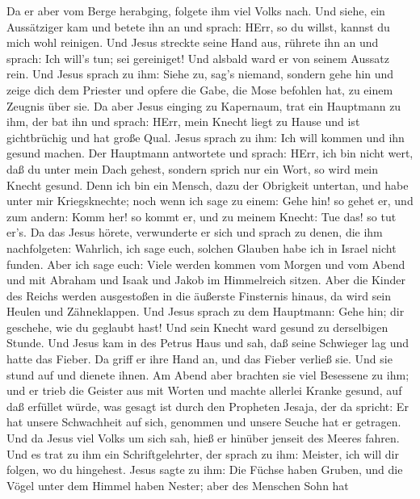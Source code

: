  Da er aber vom Berge herabging, folgete ihm viel Volks
nach.  Und siehe, ein Aussätziger kam und betete ihn an und
sprach: HErr, so du willst, kannst du mich wohl reinigen. 
Und Jesus streckte seine Hand aus, rührete ihn an und sprach: Ich will's
tun; sei gereiniget! Und alsbald ward er von seinem Aussatz rein.
 Und Jesus sprach zu ihm: Siehe zu, sag's niemand, sondern
gehe hin und zeige dich dem Priester und opfere die Gabe, die Mose
befohlen hat, zu einem Zeugnis über sie.  Da aber Jesus
einging zu Kapernaum, trat ein Hauptmann zu ihm, der bat ihn
 und sprach: HErr, mein Knecht liegt zu Hause und ist
gichtbrüchig und hat große Qual.  Jesus sprach zu ihm: Ich
will kommen und ihn gesund machen.  Der Hauptmann antwortete
und sprach: HErr, ich bin nicht wert, daß du unter mein Dach gehest,
sondern sprich nur ein Wort, so wird mein Knecht gesund. 
Denn ich bin ein Mensch, dazu der Obrigkeit untertan, und habe unter mir
Kriegsknechte; noch wenn ich sage zu einem: Gehe hin! so gehet er, und
zum andern: Komm her! so kommt er, und zu meinem Knecht: Tue das! so tut
er's.  Da das Jesus hörete, verwunderte er sich und sprach
zu denen, die ihm nachfolgeten: Wahrlich, ich sage euch, solchen Glauben
habe ich in Israel nicht funden.  Aber ich sage euch: Viele
werden kommen vom Morgen und vom Abend und mit Abraham und Isaak und
Jakob im Himmelreich sitzen.  Aber die Kinder des Reichs
werden ausgestoßen in die äußerste Finsternis hinaus, da wird sein
Heulen und Zähneklappen.  Und Jesus sprach zu dem
Hauptmann: Gehe hin; dir geschehe, wie du geglaubt hast! Und sein Knecht
ward gesund zu derselbigen Stunde.  Und Jesus kam in des
Petrus Haus und sah, daß seine Schwieger lag und hatte das Fieber.
 Da griff er ihre Hand an, und das Fieber verließ sie. Und
sie stund auf und dienete ihnen.  Am Abend aber brachten
sie viel Besessene zu ihm; und er trieb die Geister aus mit Worten und
machte allerlei Kranke gesund,  auf daß erfüllet würde, was
gesagt ist durch den Propheten Jesaja, der da spricht: Er hat unsere
Schwachheit auf sich, genommen und unsere Seuche hat er getragen.
 Und da Jesus viel Volks um sich sah, hieß er hinüber
jenseit des Meeres fahren.  Und es trat zu ihm ein
Schriftgelehrter, der sprach zu ihm: Meister, ich will dir folgen, wo du
hingehest.  Jesus sagte zu ihm: Die Füchse haben Gruben,
und die Vögel unter dem Himmel haben Nester; aber des Menschen Sohn hat
